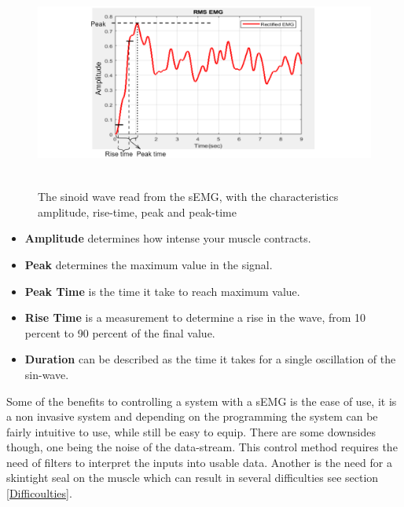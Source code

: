\begin{figure}[H]
    \centering
    \includegraphics[width=12cm,height=7cm]{Figures/EMG/RPPT.png}
    \caption{The sinoid wave read from the sEMG, with the characteristics amplitude,  rise-time, peak and peak-time\cite{EMGDATA}}
    \label{fig:sEMG}
\end{figure}

\begin{itemize}
  \item \textbf{Amplitude} determines how intense your muscle contracts.
    \item \textbf{Peak} determines the maximum value in the signal.
    \item \textbf{Peak Time} is the time it take to reach maximum value.
    \item \textbf{Rise Time} is a measurement to determine a rise in the wave, from 10 percent to 90 percent of the final value.
    \item \textbf{Duration} can be described as the time it takes for a single oscillation of the sin-wave.
\end{itemize}

Some of the benefits to controlling a system with a sEMG is the ease of use, it is a non invasive system and depending on the programming the system can be fairly intuitive to use, while still be easy to equip. 
There are some downsides though, one being the noise of the data-stream. This control method requires the need of filters to interpret the inputs into usable data. Another is the need for a skintight seal on the muscle which can result in several difficulties see section \ref{Difficoulties}.

